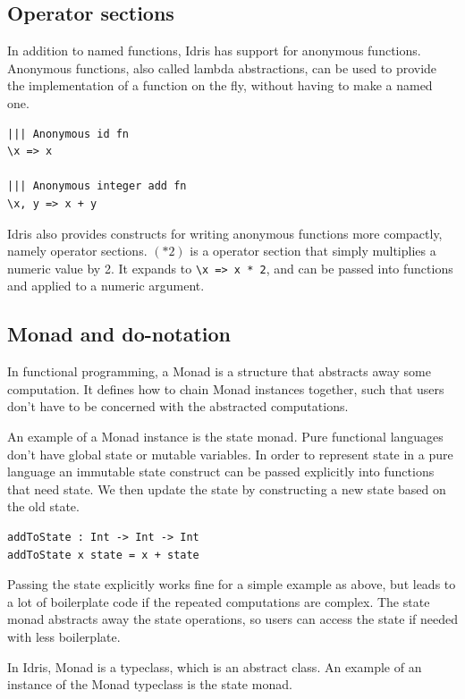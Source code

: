 \documentclass[12pt]{article}
\begin{document}
\subsection{Operator sections}

In addition to named functions, Idris has support for anonymous functions.
Anonymous functions, also called lambda abstractions, can be used to provide the implementation of a function on the fly, without having to make a named one.

\begin{lstlisting}
||| Anonymous id fn
\x => x

||| Anonymous integer add fn
\x, y => x + y

\end{lstlisting}

Idris also provides constructs for writing anonymous functions more compactly, namely operator sections.
$(*2)$ is a operator section that simply multiplies a numeric value by 2.
It expands to \lstinline{\x => x * 2}, and can be passed into functions and applied to a numeric argument.

\subsection{Monad and do-notation}

In functional programming, a Monad is a structure that abstracts away some computation.
It defines how to chain Monad instances together, such that users don't have to be concerned with the abstracted computations.

An example of a Monad instance is the state monad. 
Pure functional languages don't have global state or mutable variables.
In order to represent state in a pure language an immutable state construct can be passed explicitly into functions that need state.
We then update the state by constructing a new state based on the old state.

\begin{lstlisting}
addToState : Int -> Int -> Int
addToState x state = x + state
\end{lstlisting}

Passing the state explicitly works fine for a simple example as above, but leads to a lot of boilerplate code if the repeated computations are complex.
The state monad abstracts away the state operations, so users can access the state if needed with less boilerplate.

In Idris, Monad is a typeclass, which is an abstract class.
An example of an instance of the Monad typeclass is the state monad.
\end{document}

